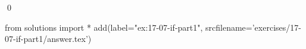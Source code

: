 
\begin{ex}
  \label{ex:17-07-if-part1}
  
  \qed
\end{ex}
\begin{python0}
from solutions import *
add(label="ex:17-07-if-part1",
    srcfilename='exercises/17-07-if-part1/answer.tex')
\end{python0}
